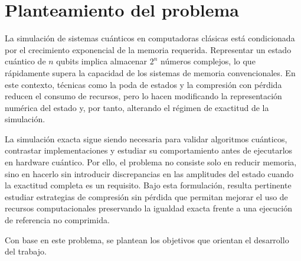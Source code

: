 \section{Planteamiento del problema}

La simulación de sistemas cuánticos en computadoras clásicas está condicionada por el crecimiento exponencial de la memoria requerida. Representar un estado cuántico de $n$ qubits implica almacenar $2^{n}$ números complejos, lo que rápidamente supera la capacidad de los sistemas de memoria convencionales. En este contexto, técnicas como la poda de estados y la compresión con pérdida reducen el consumo de recursos, pero lo hacen modificando la representación numérica del estado y, por tanto, alterando el régimen de exactitud de la simulación.

La simulación exacta sigue siendo necesaria para validar algoritmos cuánticos, contrastar implementaciones y estudiar su comportamiento antes de ejecutarlos en hardware cuántico. Por ello, el problema no consiste solo en reducir memoria, sino en hacerlo sin introducir discrepancias en las amplitudes del estado cuando la exactitud completa es un requisito. Bajo esta formulación, resulta pertinente estudiar estrategias de compresión sin pérdida que permitan mejorar el uso de recursos computacionales preservando la igualdad exacta frente a una ejecución de referencia no comprimida.

Con base en este problema, se plantean los objetivos que orientan el desarrollo del trabajo.
